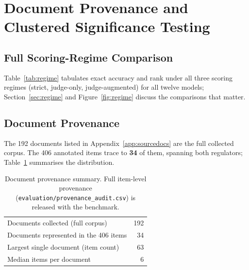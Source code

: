 \section{Document Provenance and Clustered Significance Testing}
\label{app:provenance}
\label{app:clustering}

\subsection{Full Scoring-Regime Comparison}
\label{app:regimetable}

Table~\ref{tab:regime} tabulates exact accuracy and rank under all three scoring regimes (strict,
judge-only, judge-augmented) for all twelve models; Section~\ref{sec:regime} and
Figure~\ref{fig:regime} discuss the comparisons that matter.

\begin{table}[h]
\centering
\caption{Accuracy and rank under all three scoring regimes. Strict is the automated string-matching
pipeline; judge-only treats the cross-model judge's verdict as final in both directions;
judge-augmented is the asymmetric composite strict-OR-judge (a sensitivity regime, not a primary
one). Ranks are competition ranks, so tied scores share the better rank. Generated from the released
per-item judge verdicts by \texttt{scripts/regime\_table.py}.}
\label{tab:regime}

\end{table}

\subsection{Document Provenance}

The 192 documents listed in Appendix~\ref{app:sourcedocs} are the full collected corpus. The 406
annotated items trace to \textbf{34} of them, spanning both regulators; Table~\ref{tab:provenance}
summarises the distribution.

\begin{table}[h]
\centering\small
\begin{tabular}{lr}
\toprule
Documents collected (full corpus) & 192 \\
Documents represented in the 406 items & 34 \\
Largest single document (item count) & 63 \\
Median items per document & 6 \\
\bottomrule
\end{tabular}
\caption{Document provenance summary. Full item-level provenance
(\texttt{evaluation/provenance\_audit.csv}) is released with the benchmark.}
\label{tab:provenance}
\end{table}

